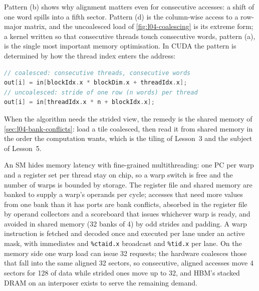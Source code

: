 \documentclass[../main.tex]{subfiles}
\begin{document}
Pattern (b) shows why alignment matters even for consecutive accesses:
a shift of one word spills into a fifth sector.  Pattern (d) is the
column-wise access to a row-major matrix, and the uncoalesced load of
\cref{fig:l04-coalescing} is its extreme form; a kernel written so that
consecutive threads touch consecutive words, pattern (a), is the single
most important memory optimisation.  In CUDA the pattern is determined by how
the thread index enters the address:
\begin{lstlisting}[language=C++, numbers=none]
// coalesced: consecutive threads, consecutive words
out[i] = in[blockIdx.x * blockDim.x + threadIdx.x];
// uncoalesced: stride of one row (n words) per thread
out[i] = in[threadIdx.x * n + blockIdx.x];
\end{lstlisting}
When the algorithm needs the strided view, the remedy is the shared
memory of \cref{sec:l04-bank-conflicts}: load a tile coalesced, then
read it from shared memory in the order the computation wants, which is
the tiling of Lesson~3 and the subject of Lesson~5.

\begin{keypoint}
  An SM hides memory latency with fine-grained multithreading: one PC
  per warp and a register set per thread stay on chip, so a warp switch
  is free and the number of warps is bounded by storage.  The register
  file and shared memory are banked to supply a warp's operands per
  cycle; accesses that need more values from one bank than it has ports
  are bank conflicts, absorbed in the register file by operand
  collectors and a scoreboard that issues whichever warp is ready, and
  avoided in shared memory (32 banks of \SI{4}{\byte}) by odd strides
  and padding.  A warp instruction is fetched and decoded once and
  executed per lane under an active mask, with immediates and
  \texttt{\%ctaid.x} broadcast and \texttt{\%tid.x} per lane.  On the
  memory side one warp load can issue 32 requests; the hardware
  coalesces those that fall into the same aligned \SI{32}{\byte}
  sectors, so consecutive, aligned accesses move 4 sectors for
  \SI{128}{\byte} of data while strided ones move up to 32, and HBM's
  stacked DRAM on an interposer exists to serve the remaining demand.
\end{keypoint}
\end{document}
